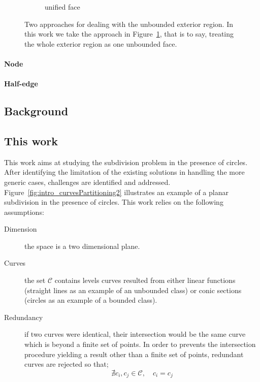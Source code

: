 \begin{figure}
\begin{subfigure}{.32\textwidth}
    \caption{unified face} \label{subfig:intro_unboundedFaces_c}
  \end{subfigure}%
  \caption[xxx]
          {Two approaches for dealing with the unbounded exterior region.
          In this work we take the approach in Figure~\ref{subfig:intro_unboundedFaces_c}, that is to say, treating the whole exterior region as one unbounded face.}
  \label{fig:intro_unboundedFaces}
\end{figure}

\paragraph{Node}
\td{}
\paragraph{Half-edge}
\td{}

\subsection{Background}


\subsection{This work}

This work aims at studying the subdivision problem in the presence of circles.
After identifying the limitation of the existing solutions in handling the more generic cases, challenges are identified and addressed.
Figure~\ref{fig:intro_curvesPartitioning2} illustrates an example of a planar subdivision in the presence of circles.
This work relies on the following assumptions:
\begin{description}
\item [Dimension] the space is a two dimensional plane.
\item [Curves] the set $\mathcal{C}$ contains levels curves resulted from either linear functions (straight lines as an example of an unbounded class) or conic sections (circles as an example of a bounded class).
\item [Redundancy] if two curves were identical, their intersection would be the same curve which is beyond a finite set of points.
  In order to prevents the intersection procedure yielding a result other than a finite set of points, redundant curves are rejected so that;
  \[ \nexists c_i , c_j \in \mathcal{C}, \quad c_i = c_j \]
\end{description}

